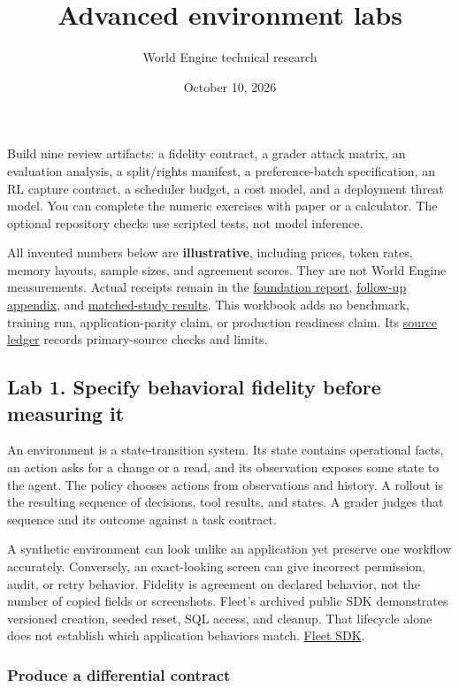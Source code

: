 \documentclass[
  11pt,
  letterpaper,
]{article}
\title{Advanced environment labs}
\author{World Engine technical research}
\date{October 10, 2026}
\makeatletter
\renewcommand{\maketitle}{\begingroup\centering
{\LARGE\@title\par}\vspace{0.6em}
{\normalsize\@author\par}\vspace{0.3em}
{\small\@date\par}\endgroup\vspace{1em}}
\makeatother
\begin{document}
\maketitle

Build nine review artifacts: a fidelity contract, a grader attack
matrix, an evaluation analysis, a split/rights manifest, a
preference-batch specification, an RL capture contract, a scheduler
budget, a cost model, and a deployment threat model. You can complete
the numeric exercises with paper or a calculator. The optional
repository checks use scripted tests, not model inference.

All invented numbers below are \textbf{illustrative}, including prices,
token rates, memory layouts, sample sizes, and agreement scores. They
are not World Engine measurements. Actual receipts remain in the
\href{world-engine-report.md}{foundation report},
\href{world-engine-follow-up.md}{follow-up appendix}, and
\href{../workflow-model-study-results.md}{matched-study results}. This
workbook adds no benchmark, training run, application-parity claim, or
production readiness claim. Its
\href{../research/ADVANCED-SOURCES.md}{source ledger} records
primary-source checks and limits.

\subsection{Lab 1. Specify behavioral fidelity before measuring
it}\label{lab-1.-specify-behavioral-fidelity-before-measuring-it}

An environment is a state-transition system. Its state contains
operational facts, an action asks for a change or a read, and its
observation exposes some state to the agent. The policy chooses actions
from observations and history. A rollout is the resulting sequence of
decisions, tool results, and states. A grader judges that sequence and
its outcome against a task contract.

A synthetic environment can look unlike an application yet preserve one
workflow accurately. Conversely, an exact-looking screen can give
incorrect permission, audit, or retry behavior. Fidelity is agreement on
declared behavior, not the number of copied fields or screenshots.
Fleet's archived public SDK demonstrates versioned creation, seeded
reset, SQL access, and cleanup. That lifecycle alone does not establish
which application behaviors match.
\href{https://github.com/fleet-ai/fleet-sdk}{Fleet SDK}.

\subsubsection{Produce a differential
contract}\label{produce-a-differential-contract}
\end{document}
